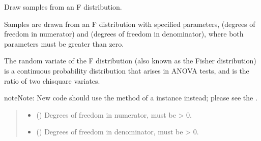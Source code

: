 \documentclass[letterpaper,10pt,english]{sphinxmanual}
\begin{document}
\begin{fulllineitems}
\label{\detokenize{metilda.controllers:metilda.controllers.pitch_art_wizard.f}}
\pysigstartsignatures
{}
\pysigstopsignatures
\sphinxAtStartPar
Draw samples from an F distribution.

\sphinxAtStartPar
Samples are drawn from an F distribution with specified parameters,
 (degrees of freedom in numerator) and  (degrees of
freedom in denominator), where both parameters must be greater than
zero.

\sphinxAtStartPar
The random variate of the F distribution (also known as the
Fisher distribution) is a continuous probability distribution
that arises in ANOVA tests, and is the ratio of two chi\sphinxhyphen{}square
variates.

\begin{sphinxadmonition}{note}{Note:}
\sphinxAtStartPar
New code should use the 
method of a  instance instead;
please see the .
\end{sphinxadmonition}
\begin{quote}\begin{description}
\begin{itemize}
\item {} 
\sphinxAtStartPar
{} () \textendash{} Degrees of freedom in numerator, must be \textgreater{} 0.

\item {} 
\sphinxAtStartPar
{} () \textendash{} Degrees of freedom in denominator, must be \textgreater{} 0.


\end{itemize}
\end{description}
\end{quote}
\end{fulllineitems}
\end{document}
